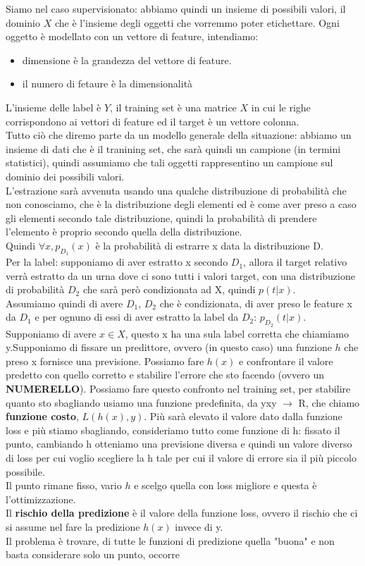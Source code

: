 \documentclass[12pt, oneside]{extbook}
\begin{document}
Siamo nel caso supervisionato: abbiamo quindi un insieme di possibili valori, il dominio $X$ che è l'insieme degli oggetti che vorremmo poter etichettare. Ogni oggetto è modellato con un vettore di feature, intendiamo:
\begin{itemize}
	\item dimensione è la grandezza del vettore di feature.
	\item il numero di fetaure è la dimensionalità
\end{itemize}
L'insieme delle label è $Y$, il training set è una matrice $X$ in cui le righe corrispondono ai vettori di feature ed il target è un vettore colonna.\\Tutto ciò che diremo parte da un modello generale della situazione: abbiamo un insieme di dati che è il tranining set, che sarà quindi un campione (in termini statistici), quindi assumiamo che tali oggetti rappresentino un campione sul dominio dei possibili valori.\\L'estrazione sarà avvenuta usando una qualche distribuzione di probabilità che non conosciamo, che è la distribuzione degli elementi ed è come aver preso a caso gli elementi secondo tale distribuzione, quindi la probabilità di prendere l'elemento è proprio secondo quella della distribuzione.\\Quindi $\forall x, p_{D_1}(x)$ è la probabilità di estrarre x data la distribuzione D.\\Per la label: supponiamo di aver estratto x secondo $D_1$, allora il target relativo verrà estratto da un urna dove ci sono tutti i valori target, con una distribuzione di probabilità $D_2$ che sarà però condizionata ad X, quindi $p(t|x)$.\\Assumiamo quindi di avere $D_1$, $D_2$ che è condizionata, di aver preso le feature x da $D_1$ e per ognuno di essi di aver estratto la label da $D_2$: $p_{D_2}(t|x)$.\\Supponiamo di avere $x \in X$, questo x ha una sula label corretta che chiamiamo y.Supponiamo di fissare un predittore, ovvero (in questo caso) una funzione $h$ che preso x fornisce una previsione. Possiamo fare $h(x)$ e confrontare il valore predetto con quello corretto e stabilire l'errore che sto facendo (ovvero un \textbf{NUMERELLO}). Possiamo fare questo confronto nel training set, per stabilire quanto sto sbagliando usiamo una funzione predefinita, da yxy $\rightarrow$ R, che chiamo \textbf{funzione costo}, $L(h(x), y)$. Più sarà elevato il valore dato dalla funzione loss e più stiamo sbagliando, consideriamo tutto come funzione di h: fissato il punto, cambiando h otteniamo una previsione diversa e quindi un valore diverso di loss per cui voglio scegliere la h tale per cui il valore di errore sia il più piccolo possibile.\\Il punto rimane fisso, vario $h$ e scelgo quella con loss migliore e questa è l'ottimizzazione.\\Il \textbf{rischio della predizione} è il valore della funzione loss, ovvero il rischio che ci si assume nel fare la predizione $h(x)$ invece di y.\\Il problema è trovare, di tutte le funzioni di predizione quella "buona" e non basta considerare solo un punto, occorre 
\end{document}
